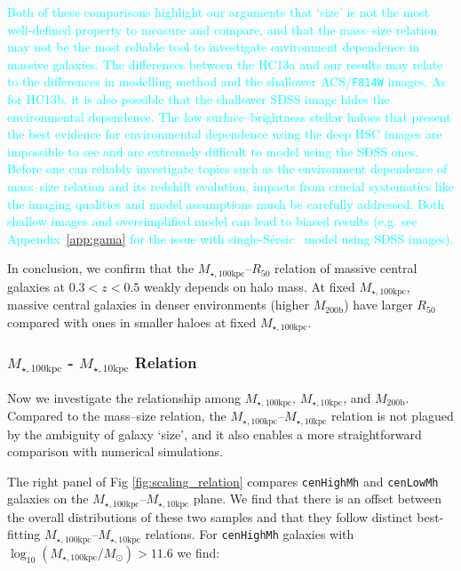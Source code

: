 \documentclass[a4paper,fleqn,usenatbib]{mnras}
\def\ser{{S\'{e}rsic\ }}
\def\rbcg{\texttt{cenHighMh}}
\def\nbcg{\texttt{cenLowMh}}
\def\mhalo{{$M_{\mathrm{200b}}$}}
\def\minn{{$M_{\star,10\mathrm{kpc}}$}}
\def\mtot{{$M_{\star,100\mathrm{kpc}}$}}
\def\logmtot{{$\log_{10} (M_{\star,100\mathrm{kpc}}/M_{\odot})$}}
\newcommand{\song}[1]{\textcolor{cyan}{#1}}
\begin{document}
    \song{
    Both of these comparisons highlight our arguments that `size' is not the most 
    well-defined property to measure and compare, and that the mass--size relation 
    may not be the most reliable tool to investigate environment dependence in 
    massive galaxies.
    The differences between the HC13a and our results may relate to the differences 
    in modelling method and the shallower ACS/\texttt{F814W} images. 
    As for HC13b, it is also possible that the shallower SDSS image hides the
    environmental dependence.  
    The low surface--brightness stellar haloes that present the best evidence for 
    environmental dependence using the deep HSC images are impossible to see and 
    are extremely difficult to model using the SDSS ones. 
    Before one can reliably investigate topics such as the environment dependence 
    of mass--size relation and its redshift evolution, impacts from crucial systematics 
    like the imaging qualities and model assumptions much be carefully addressed. 
    Both shallow images and oversimplified model can lead to biased results 
    (e.g. see Appendix~\ref{app:gama} for the issue with single-\ser{} model 
    using SDSS images).
    }    

    In conclusion, we confirm that the \mtot{}--$R_{\mathrm{50}}$ relation of massive
    central galaxies at $0.3 < z < 0.5$ weakly depends on halo mass. 
    At fixed \mtot{}, massive central galaxies in denser environments (higher \mhalo{}) 
    have larger $R_{\mathrm{50}}$ compared with ones in smaller haloes at fixed 
    \mtot{}. 
    
\subsubsection{\mtot{} - \minn{} Relation}
    \label{sssec:m100_m10}
    
    Now we investigate the relationship among \mtot{}, \minn{}, and \mhalo{}. 
    Compared to the mass--size relation, the \mtot{}--\minn{} relation is not plagued 
    by the ambiguity of galaxy `size', and it also enables a more straightforward 
    comparison with numerical simulations.
    
    The right panel of Fig \ref{fig:scaling_relation} compares \rbcg{} and \nbcg{}
    galaxies on the \mtot{}--\minn{} plane. 
    We find that there is an offset between the overall distributions of these two
    samples and that they follow distinct best-fitting \mtot{}--\minn{} relations. 
    For \rbcg{} galaxies with \logmtot{}$>11.6$ we find:
    
\end{document}
